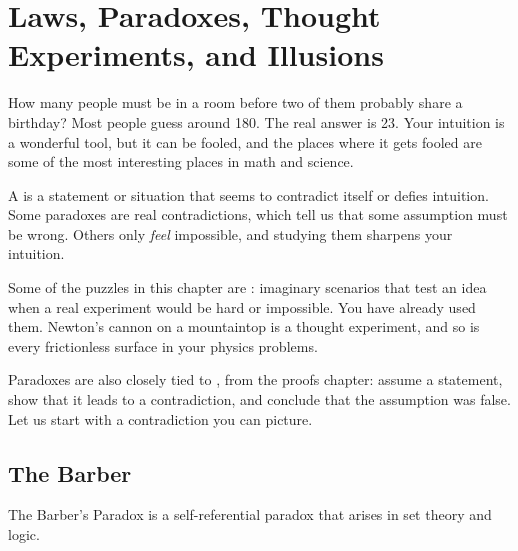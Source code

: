 \chapter{Laws, Paradoxes, Thought Experiments, and Illusions}
How many people must be in a room before two of them probably share a
birthday? Most people guess around 180. The real answer is 23. Your
intuition is a wonderful tool, but it can be fooled, and the places where
it gets fooled are some of the most interesting places in math and
science.

A  is a statement or situation that seems to contradict
itself or defies intuition. Some paradoxes are real
contradictions, which tell us that some assumption must be wrong. Others
only \emph{feel} impossible, and studying them sharpens your intuition.

Some of the puzzles in this chapter are : imaginary scenarios that test an
idea when a real experiment would be hard or impossible. You have already
used them. Newton's cannon on a mountaintop is a thought experiment, and so
is every frictionless surface in your physics problems.

Paradoxes are also closely tied to , from
the proofs chapter: assume a statement, show that it leads to a
contradiction, and conclude that the assumption was false. Let us start
with a contradiction you can picture.

\section{The Barber}

The Barber's Paradox is a self-referential paradox that arises in set theory and logic.

